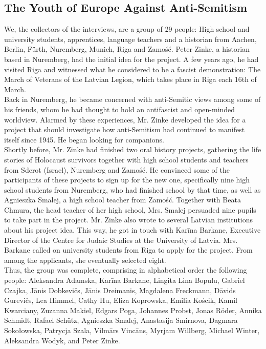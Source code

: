 \subsection*{The Youth of Europe Against Anti-Semitism} 
We, the collectors of the interviews, are a group of 29 people: High school and university students, apprentices, language teachers and a historian from Aachen, Berlin, Fürth, Nuremberg, Munich, Riga and Zamość. Peter Zinke, a historian based in Nuremberg, had the initial idea for the project. A few years ago, he had visited Riga and witnessed what he considered to be a fascist demonstration: The March of Veterans of the Latvian Legion, which takes place in Riga each 16th of March. \\
Back in Nuremberg, he became concerned with anti-Semitic views among some of his friends, whom he had thought to hold an antifascist and open-minded worldview. Alarmed by these experiences, Mr. Zinke developed the idea for a project that should investigate how anti-Semitism had continued to manifest itself since 1945. He began looking for companions. \\
Shortly before, Mr. Zinke had finished two oral history projects, gathering the life stories of Holocaust survivors together with high school students and teachers from Sderot (Israel), Nuremberg and Zamość. He convinced some of the participants of these projects to sign up for the new one, specifically nine high school students from Nuremberg, who had finished school by that time, as well as Agnieszka Smalej, a high school teacher from Zamość. Together with Beata Chmura, the head teacher of her high school, Mrs. Smalej persuaded nine pupils to take part in the project. Mr. Zinke also wrote to several Latvian institutions about his project idea. This way, he got in touch with Karīna Barkane, Executive Director of the Centre for Judaic Studies at the University of Latvia. Mrs. Barkane called on university students from Riga to apply for the project. From among the applicants, she eventually selected eight.\\
Thus, the group was complete, comprising in alphabetical order the following people: Aleksandra Adamska, Karīna Barkane, Lingita Lina Bopulu, Gabriel Czajka, Jānis Dobkevičs, Jānis Dreimanis, Magdalena Freckmann, Dāvids Gurevičs, Lea Himmel, Cathy Hu, Eliza Koprowska, Emilia Kościk, Kamil Kwarciany, Zuzanna Makiel, Edgars Poga, Johannes Probst, Jonas Röder, Annika Schmidt, Rafael Schütz, Agnieszka Smalej, Anastasija Smirnova, Dagmara Sokołowska, Patrycja Szala, Vilmārs Vincāns, Myrjam Willberg, Michael Winter, Aleksandra Wodyk, and Peter Zinke. \\
